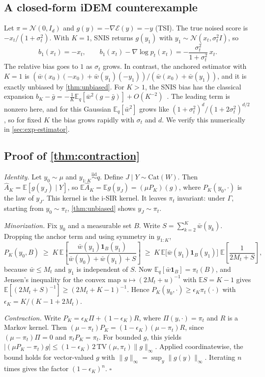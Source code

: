 \subsection{A closed-form iDEM counterexample}
\label{app:idem-bias}
Let $\pi=\mathcal{N}(0,I_d)$ and $g(y)=-\nabla\mathcal{E}(y)=-y$ (TSI). The true noised score is $-x_t/(1+\sigma_t^2)$. With $K=1$, SNIS returns $g(y_1)$ with $y_1\sim\mathcal{N}(x_t,\sigma_t^2I)$, so
\[
b_1(x_t)=-x_t,\qquad b_1(x_t)-\nabla\log p_t(x_t)=-\frac{\sigma_t^2}{1+\sigma_t^2}\,x_t .
\]
The relative bias goes to $1$ as $\sigma_t$ grows. In contrast, the anchored estimator with $K=1$ is $(\bar w(x_0)(-x_0)+\bar w(y_1)(-y_1))/(\bar w(x_0)+\bar w(y_1))$, and it is exactly unbiased by \cref{thm:unbiased}. For $K>1$, the SNIS bias has the classical expansion $b_K-\bar g=-\frac1K\mathbb{E}_q[\bar w^2(g-\bar g)]+O(K^{-2})$~\citep{owen2013monte}. The leading term is nonzero here, and for this Gaussian $\mathbb{E}_q[\bar w^2]$ grows like $(1+\sigma_t^2)^{d}/(1+2\sigma_t^2)^{d/2}$, so for fixed $K$ the bias grows rapidly with $\sigma_t$ and $d$. We verify this numerically in \cref{sec:exp-estimator}.

\subsection{Proof of \cref{thm:contraction}}
\emph{Identity.} Let $y_0\sim\mu$ and $y_{1:K}\overset{\text{iid}}{\sim}q$. Define $J\mid Y\sim\mathrm{Cat}(W)$. Then $\widehat A_K=\mathbb{E}[g(y_J)\mid Y]$, so $\mathbb{E}\widehat A_K=\mathbb{E}g(y_J)=(\mu P_K)(g)$, where $P_K(y_0,\cdot)$ is the law of $y_J$. This kernel is the i-SIR kernel. It leaves $\pi_t$ invariant: under $\Gamma$, starting from $y_0\sim\pi_t$, \cref{thm:unbiased} shows $y_J\sim\pi_t$.

\emph{Minorization.} Fix $y_0$ and a measurable set $B$. Write $S=\sum_{k=2}^K\bar w(y_k)$. Dropping the anchor term and using symmetry in $y_{1:K}$,
\[
P_K(y_0,B)\;\ge\;K\,\mathbb{E}\!\left[\frac{\bar w(y_1)\mathbf 1_B(y_1)}{\bar w(y_0)+\bar w(y_1)+S}\right]
\;\ge\;K\,\mathbb{E}\big[\bar w(y_1)\mathbf 1_B(y_1)\big]\;\mathbb{E}\!\left[\frac{1}{2M_t+S}\right],
\]
because $\bar w\le M_t$ and $y_1$ is independent of $S$. Now $\mathbb{E}_q[\bar w\mathbf 1_B]=\pi_t(B)$, and Jensen's inequality for the convex map $u\mapsto(2M_t+u)^{-1}$ with $\mathbb{E}S=K-1$ gives $\mathbb{E}[(2M_t+S)^{-1}]\ge(2M_t+K-1)^{-1}$. Hence $P_K(y_0,\cdot)\ge\epsilon_K\pi_t(\cdot)$ with $\epsilon_K=K/(K-1+2M_t)$.

\emph{Contraction.} Write $P_K=\epsilon_K\Pi+(1-\epsilon_K)R$, where $\Pi(y,\cdot)=\pi_t$ and $R$ is a Markov kernel. Then $(\mu-\pi_t)P_K=(1-\epsilon_K)(\mu-\pi_t)R$, since $(\mu-\pi_t)\Pi=0$ and $\pi_tP_K=\pi_t$. For bounded $g$, this yields $|(\mu P_K-\pi_t)g|\le(1-\epsilon_K)\,2\,\mathrm{TV}(\mu,\pi_t)\|g\|_\infty$. Applied coordinatewise, the bound holds for vector-valued $g$ with $\|g\|_\infty=\sup_y\|g(y)\|_\infty$. Iterating $n$ times gives the factor $(1-\epsilon_K)^n$. \hfill$\square$

